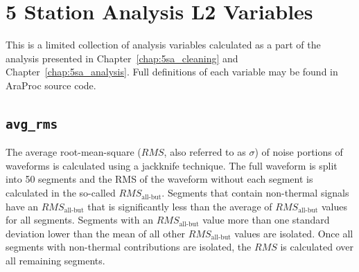 \chapter{5 Station Analysis L2 Variables \label{app:5savariables}}

This is a limited collection of analysis variables calculated as a part of the analysis presented in Chapter~\ref{chap:5sa_cleaning} and Chapter~\ref{chap:5sa_analysis}. 
Full definitions of each variable may be found in AraProc source code.

\section{\texttt{avg\_rms} \label{sec:rms}}

  The average root-mean-square ($RMS$, also referred to as $\sigma$) of noise portions of waveforms is calculated using a jackknife technique. 
  The full waveform is split into 50 segments and the RMS of the waveform without each segment is calculated in the so-called $RMS_{\text{all-but}}$. 
  Segments that contain non-thermal signals have an $RMS_{\text{all-but}}$ that is significantly less than the average of $RMS_{\text{all-but}}$ values for all segments. 
  Segments with an $RMS_{\text{all-but}}$ value more than one standard deviation lower than the mean of all other $RMS_{\text{all-but}}$ values are isolated. 
  Once all segments with non-thermal contributions are isolated, the $RMS$ is calculated over all remaining segments. 

